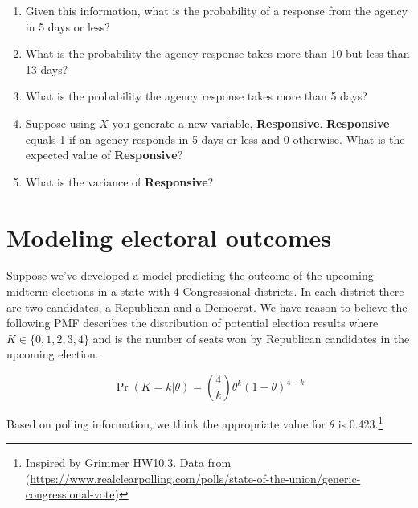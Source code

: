 \documentclass[
]{article}
\begin{document}
\begin{enumerate}
\def\labelenumi{\alph{enumi}.}
\item
  Given this information, what is the probability of a response from the
  agency in 5 days or less?

  \hfill\break
  \hfill\break
  \hfill\break
  \hfill\break
  \hfill\break
  \hfill\break
  \hfill\break
\item
  What is the probability the agency response takes more than 10 but
  less than 13 days?
\item
  What is the probability the agency response takes more than 5 days?

  \hfill\break
  \hfill\break
  \hfill\break
  \hfill\break
  \hfill\break
  \hfill\break
  \hfill\break
\item
  Suppose using \(X\) you generate a new variable, \textbf{Responsive}.
  \textbf{Responsive} equals 1 if an agency responds in 5 days or less
  and 0 otherwise. What is the expected value of \textbf{Responsive}?

  \hfill\break
  \hfill\break
  \hfill\break
  \hfill\break
  \hfill\break
  \hfill\break
  \hfill\break
\item
  What is the variance of \textbf{Responsive}?

  \hfill\break
  \hfill\break
  \hfill\break
  \hfill\break
  \hfill\break
  \hfill\break
  \hfill\break
\end{enumerate}

\section{Modeling electoral outcomes}\label{modeling-electoral-outcomes}

Suppose we've developed a model predicting the outcome of the upcoming
midterm elections in a state with 4 Congressional districts. In each
district there are two candidates, a Republican and a Democrat. We have
reason to believe the following PMF describes the distribution of
potential election results where \(K \in \{0,1,2,3,4\}\) and is the
number of seats won by Republican candidates in the upcoming election.

\[
\Pr(K=k | \theta) = \binom{4}{k} \theta^{k} (1-\theta)^{4-k}
\]

Based on polling information, we think the appropriate value for
\(\theta\) is 0.423.\footnote{Inspired by Grimmer HW10.3. Data from
  (\url{https://www.realclearpolling.com/polls/state-of-the-union/generic-congressional-vote})}
\end{document}
